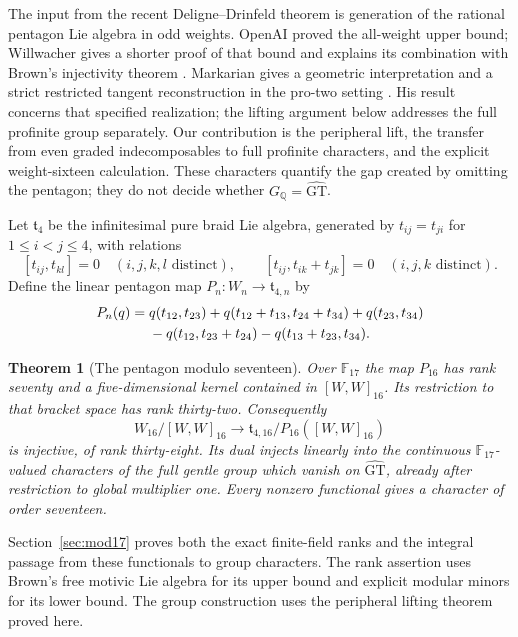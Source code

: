 \documentclass[11pt]{article}
\newcommand{\GT}{\widehat{\mathrm{GT}}}
\newcommand{\F}{\mathbb F}
\newcommand{\Q}{\mathbb Q}
\newtheorem{theorem}{Theorem}[section]
\theoremstyle{definition}
\theoremstyle{remark}
\begin{document}
The input from the recent Deligne--Drinfeld theorem is generation of the
rational pentagon Lie algebra in odd weights.  OpenAI proved the all-weight
upper bound; Willwacher gives a shorter proof of that bound and explains
its combination with Brown's injectivity theorem
\cite[Theorem 1.1 and (7), pp.~1--2]{Willwacher}.
Markarian gives a geometric interpretation and a strict restricted tangent
reconstruction in the pro-two setting \cite[Theorem 4.8 and \S5]{Markarian}.
His result concerns that specified realization; the lifting argument below
addresses the full profinite group separately.
Our contribution is the peripheral lift, the transfer from even graded
indecomposables to full profinite characters, and the explicit weight-sixteen
calculation.  These characters quantify the gap created by omitting the
pentagon; they do not decide whether $G_{\Q}=\GT$.

Let $\mathfrak t_4$ be the infinitesimal pure braid Lie algebra, generated
by $t_{ij}=t_{ji}$ for $1\leq i<j\leq4$, with relations
\[
 [t_{ij},t_{kl}]=0\quad(i,j,k,l\text{ distinct}),\qquad
 [t_{ij},t_{ik}+t_{jk}]=0\quad(i,j,k\text{ distinct}).
\]
Define the linear pentagon map $P_n:W_n\to\mathfrak t_{4,n}$ by
\begin{align}
P_n(q)={}&q(t_{12},t_{23})+
q(t_{12}+t_{13},t_{24}+t_{34})+q(t_{23},t_{34})\notag\\
&-q(t_{12},t_{23}+t_{24})-q(t_{13}+t_{23},t_{34}).\label{eq:pentagon}
\end{align}

\begin{theorem}[The pentagon modulo seventeen]\label{thm:main-pentagon17}
Over $\F_{17}$ the map $P_{16}$ has rank seventy and a
five-dimensional kernel contained in $[W,W]_{16}$. Its restriction
to that bracket space has rank thirty-two. Consequently
\[
 W_{16}/[W,W]_{16}\longrightarrow
 \mathfrak t_{4,16}/P_{16}([W,W]_{16})
\]
is injective, of rank thirty-eight. Its dual injects linearly into
the continuous $\F_{17}$-valued characters of the full gentle group
which vanish on $\GT$, already after restriction to global
multiplier one. Every nonzero functional gives a character of order
seventeen.
\end{theorem}

Section~\ref{sec:mod17} proves both the exact finite-field ranks and
the integral passage from these functionals to group characters.
The rank assertion uses Brown's free motivic Lie algebra for
its upper bound and explicit modular minors for its lower bound.
The group construction uses the peripheral lifting theorem proved here.
\end{document}
